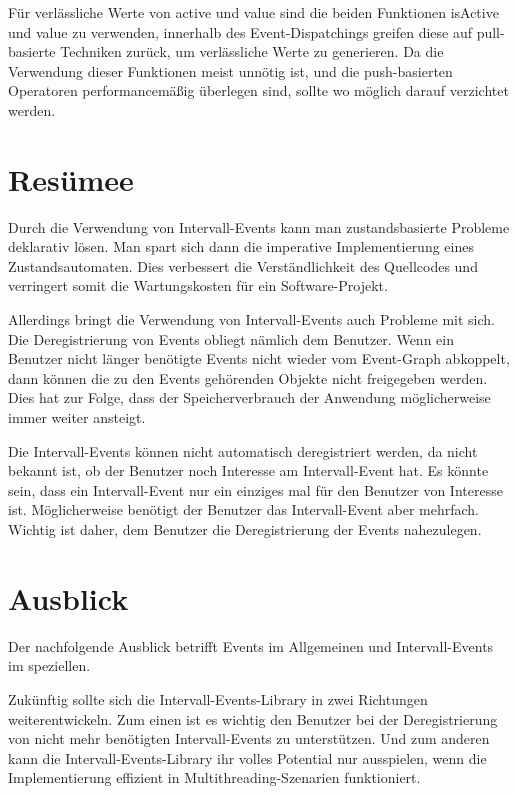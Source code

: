 \documentclass[article,colorback,accentcolor=tud4c]{tudreport}
\begin{document}
Für verlässliche Werte von active und value sind die beiden Funktionen isActive und value zu verwenden, innerhalb des Event-Dispatchings greifen diese auf pull-basierte Techniken zurück, um verlässliche Werte zu generieren. Da die Verwendung dieser Funktionen meist unnötig ist, und die push-basierten Operatoren performancemäßig überlegen sind, sollte wo möglich darauf verzichtet werden.




\section{Resümee}
Durch die Verwendung von Intervall-Events kann man zustandsbasierte
Probleme deklarativ lösen. Man spart sich dann die imperative Implementierung
eines Zustandsautomaten. Dies verbessert die Verständlichkeit des Quellcodes und
verringert somit die Wartungskosten für ein Software-Projekt. 

Allerdings bringt die Verwendung von Intervall-Events auch Probleme mit sich.
Die Deregistrierung von Events obliegt nämlich dem Benutzer. Wenn ein Benutzer
nicht länger benötigte Events nicht wieder vom Event-Graph abkoppelt, dann
können die zu den Events gehörenden Objekte nicht freigegeben werden. Dies hat
zur Folge, dass der Speicherverbrauch der Anwendung möglicherweise immer weiter
ansteigt. 

Die Intervall-Events können nicht automatisch deregistriert werden, da nicht
bekannt ist, ob der Benutzer noch Interesse am Intervall-Event hat. Es könnte
sein, dass ein Intervall-Event nur ein einziges mal für den Benutzer von
Interesse ist. Möglicherweise benötigt der Benutzer das Intervall-Event aber
mehrfach. Wichtig ist daher, dem Benutzer die Deregistrierung der Events
nahezulegen.

\section{Ausblick}
Der nachfolgende Ausblick betrifft Events im Allgemeinen und Intervall-Events im
speziellen.

Zukünftig sollte sich die Intervall-Events-Library in zwei Richtungen
weiterentwickeln. Zum einen ist es wichtig den Benutzer bei der Deregistrierung
von nicht mehr benötigten Intervall-Events zu unterstützen. Und zum anderen kann
die Intervall-Events-Library ihr volles Potential nur ausspielen, wenn
die Implementierung effizient in Multithreading-Szenarien funktioniert.
\end{document}
